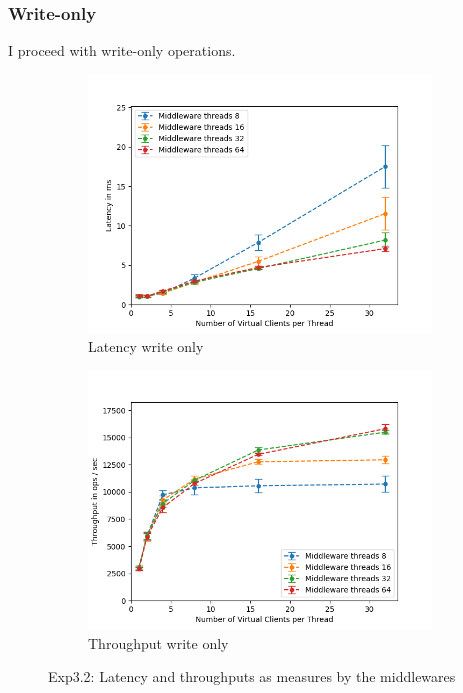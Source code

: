\documentclass[11pt,a4paper]{article}
\begin{document}
\subsubsection{Write-only}

I proceed with write-only operations.

\begin{figure}[H]
\centering
\begin{subfigure}{.5\textwidth}
    \centering
    \includegraphics[width=\textwidth]{img/exp3_2/exp3_2__latency_middleware_write_1.png}
    \caption{Latency write only}
    \label{fig:mesh1}
\end{subfigure}%
\begin{subfigure}{.5\textwidth}
      \centering
    \includegraphics[width=\textwidth]{img/exp3_2/exp3_2__throughput_middleware_write_1.png}
    \caption{Throughput write only}
    \label{fig:mesh1}
\end{subfigure}
\caption{Exp3.2: Latency and throughputs as measures by the middlewares}
\label{fig:test}
\end{figure}
\end{document}
